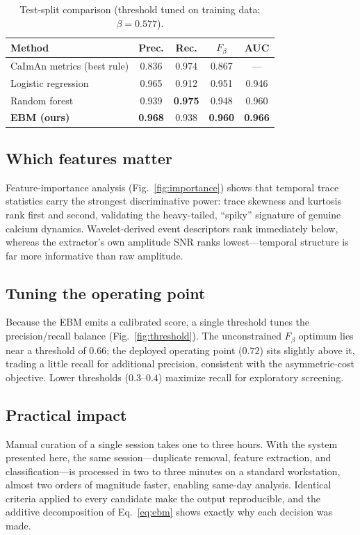\documentclass[conference]{IEEEtran}
\begin{document}
\begin{table}[t]
\caption{Test-split comparison (threshold tuned on training data; $\beta=0.577$).}
\centering
\begin{tabular}{lcccc}
\toprule
Method & Prec. & Rec. & $F_\beta$ & AUC \\
\midrule
CaImAn metrics (best rule) & 0.836 & 0.974 & 0.867 & --- \\
Logistic regression        & 0.965 & 0.912 & 0.951 & 0.946 \\
Random forest              & 0.939 & \textbf{0.975} & 0.948 & 0.960 \\
\textbf{EBM (ours)}        & \textbf{0.968} & 0.938 & \textbf{0.960} & \textbf{0.966} \\
\bottomrule
\end{tabular}
\label{tab:baselines}
\end{table}

\subsection{Which features matter}

Feature-importance analysis (Fig.~\ref{fig:importance}) shows that temporal trace statistics carry the strongest discriminative power: trace skewness and kurtosis rank first and second, validating the heavy-tailed, ``spiky'' signature of genuine calcium dynamics. Wavelet-derived event descriptors rank immediately below, whereas the extractor's own amplitude SNR ranks lowest---temporal structure is far more informative than raw amplitude.

\subsection{Tuning the operating point}

Because the EBM emits a calibrated score, a single threshold tunes the precision/recall balance (Fig.~\ref{fig:threshold}). The unconstrained $F_\beta$ optimum lies near a threshold of $0.66$; the deployed operating point ($0.72$) sits slightly above it, trading a little recall for additional precision, consistent with the asymmetric-cost objective. Lower thresholds ($0.3$--$0.4$) maximize recall for exploratory screening.

\subsection{Practical impact}

Manual curation of a single session takes one to three hours. With the system presented here, the same session---duplicate removal, feature extraction, and classification---is processed in two to three minutes on a standard workstation, almost two orders of magnitude faster, enabling same-day analysis. Identical criteria applied to every candidate make the output reproducible, and the additive decomposition of Eq.~\ref{eq:ebm} shows exactly why each decision was made.
\end{document}
